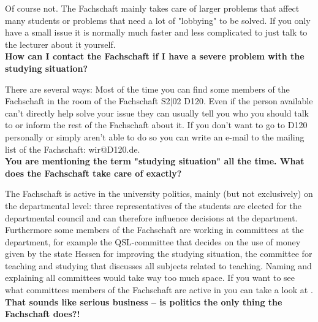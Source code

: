 {Of course not. The Fachschaft mainly takes care of larger problems that affect many students or problems that need a lot of "lobbying" to be solved. If you only have a small issue it is normally much faster and less complicated to just talk to the lecturer about it yourself.\\

\textbf{How can I contact the Fachschaft if I have a severe problem with the studying situation?}

There are several ways: Most of the time you can find some members of the Fachschaft in the room of the Fachschaft S2$|$02 D120. Even if the person available can't directly help solve your issue they can usually tell you who you should talk to or inform the rest of the Fachschaft about it. If you don't want to go to D120 personally or simply aren't able to do so you can write an e-mail to the mailing list of the Fachschaft: wir@D120.de.\\

\textbf{You are mentioning the term "studying situation" all the time. What does the Fachschaft take care of exactly?}

The Fachschaft is active in the university politics, mainly (but not exclusively) on the departmental level: three representatives of the students are elected for the departmental council and can therefore influence decisions at the department. Furthermore some members of the Fachschaft are working in committees at the department, for example the QSL-committee that decides on the use of money given by the state Hessen for improving the studying situation, the committee for teaching and studying that discusses all subjects related to teaching. Naming and explaining all committees would take way too much space. If you want to see what committees members of the Fachschaft are active in you can take a look at \footnotemark[1].\\

\textbf{That sounds like serious business – is politics the only thing the Fachschaft does?!}

}
